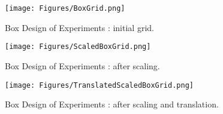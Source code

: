              \begin{figure}[H]
               \begin{minipage}{10cm}
                 \begin{center}
                   \texttt{[image: Figures/BoxGrid.png]}
                   \caption{Box Design of Experiments  : initial grid.}
                   \label{BoxGrid}
                 \end{center}
               \end{minipage}
               \hfill
               \begin{minipage}{10cm}
                 \begin{center}
                   \texttt{[image: Figures/ScaledBoxGrid.png]}
                   \caption{Box Design of Experiments  : after scaling.}
                   \label{ScaledBoxGrid}
                 \end{center}
               \end{minipage}
             \end{figure}

             \begin{figure}[H]
               \begin{center}
                 \texttt{[image: Figures/TranslatedScaledBoxGrid.png]}
               \end{center}
               \caption{Box Design of Experiments  : after scaling and translation.}
               \label{TranslatedScaledBoxGrid}
             \end{figure}
